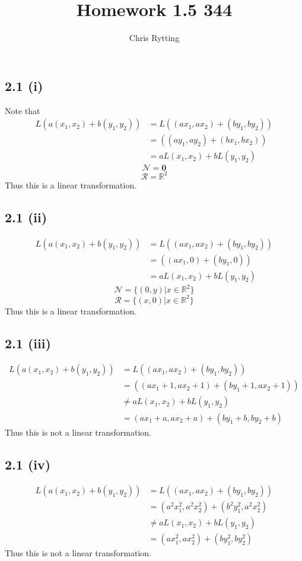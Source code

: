 \documentclass[letterpaper,12pt]{article}
\theoremstyle{definition}
\begin{document}
\title{Homework 1.5 344}
\author{Chris Rytting}
\maketitle
\subsection*{2.1 (i)}
Note that 
\begin{align*}
    L(a(x_1,x_2) + b(y_1,y_2)) &= L((ax_1,ax_2) + (by_1,by_2)) 
    \\&=((ay_1,ay_2) + (bx_1,bx_2)) 
    \\&=aL(x_1,x_2) + bL(y_1,y_2)
\end{align*}
\[ \mathscr{N} = {\mathbf{0} } \]
\[ \mathscr{R} = \mathbb{R}^2\]
Thus this is a linear transformation.

\subsection*{2.1 (ii)}
\begin{align*}
    L(a(x_1,x_2) + b(y_1,y_2)) &= L((ax_1,ax_2) + (by_1,by_2)) 
    \\&=((ax_1,0) + (by_1,0)) 
    \\&=aL(x_1,x_2) + bL(y_1,y_2)
\end{align*}
\[ \mathscr{N} = \{(0,y) \vert x \in\mathbb{R}^2\}\]
\[ \mathscr{R} = \{(x,0) \vert x \in\mathbb{R}^2\}\]
Thus this is a linear transformation.

\subsection*{2.1 (iii)}

\begin{align*}
    L(a(x_1,x_2) + b(y_1,y_2)) &= L((ax_1,ax_2) + (by_1,by_2)) 
    \\&=((ax_1 + 1,ax_2 + 1) + (by_1 + 1,ax_2 + 1)) 
    \\&\neq aL(x_1,x_2) + bL(y_1,y_2)
    \\&= (ax_1 + a,ax_2 + a) + (by_1 + b,by_2 + b)
\end{align*}
Thus this is not a linear transformation.

\subsection*{2.1 (iv)}
\begin{align*}
    L(a(x_1,x_2) + b(y_1,y_2)) &= L((ax_1,ax_2) + (by_1,by_2)) 
    \\&=( a^2x_1^2, a^2x_2^2 ) + ( b^2y_1^2, a^2x_2^2) 
    \\&\neq aL(x_1,x_2) + bL(y_1,y_2)
    \\&= (ax_1^2,ax_2^2) + (by_1^2,by_2^2)
\end{align*}
Thus this is not a linear transformation.
\end{document}
